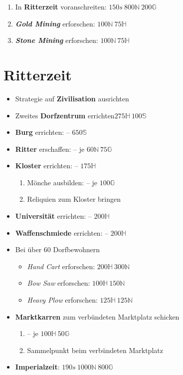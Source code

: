 \documentclass[10pt,twocolumn,a4paper]{article}
\begin{document}
\begin{enumerate}
\item In \textbf{Ritterzeit} voranschreiten: \hfill$150s~800\mathbb N~200\mathbb G$
\item \textbf{\emph{Gold Mining}} erforschen: \hfill$100\mathbb N~75\mathbb H$
\item \textbf{\emph{Stone Mining}} erforschen: \hfill$100\mathbb N~75\mathbb H$
\end{enumerate}
\section{Ritterzeit}
\begin{itemize}
\item Strategie auf \textbf{Zivilisation} ausrichten
\item Zweites \textbf{Dorfzentrum} errichten\hfill$275\mathbb H~100\mathbb S$
\item \textbf{Burg} errichten:  -- \hfill$650\mathbb S$
\item \textbf{Ritter} erschaffen:  -- \hfill je $60\mathbb N~75\mathbb G$
\item \textbf{Kloster} errichten:  -- \hfill$175\mathbb H$\begin{enumerate}[label=(\alph*)]\item Mönche ausbilden:  -- \hfill je $100\mathbb G$\item Reliquien zum Kloster bringen\end{enumerate}
\item \textbf{Universität} errichten:  -- \hfill$200\mathbb H$
\item \textbf{Waffenschmiede} errichten:  -- \hfill$200\mathbb H$
\item Bei über 60 Dorfbewohnern\begin{itemize}\item \emph{Hand Cart} erforschen: \hfill$200\mathbb H~300\mathbb N$\item\emph{Bow Saw} erforschen: \hfill$100\mathbb H~150\mathbb N$\item\emph{Heavy Plow} erforschen: \hfill$125\mathbb H~125\mathbb N$\end{itemize}
\item \textbf{Marktkarren} zum verbündeten Marktplatz schicken\begin{enumerate}[label=(\alph*)]\item{} -- \hfill je $100\mathbb H~50\mathbb G$\item Sammelpunkt beim verbündeten Marktplatz\end{enumerate}
\item \textbf{Imperialzeit}: \hfill$190s~1000\mathbb N~800\mathbb G$
\end{itemize}
\end{document}
